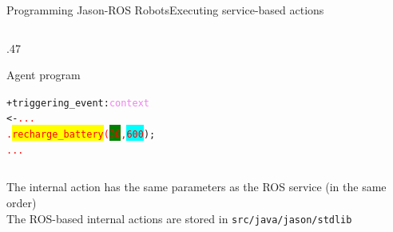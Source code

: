 \documentclass[compress]{beamer}
\newcommand{\planhead}[1]{\textcolor{indiagreen}{#1}}
\newcommand{\instruction}[1]{\textcolor{red}{#1}}
\newcommand{\belief}[1]{\textcolor{violet}{#1}}
\begin{document}
\begin{frame}[fragile]{Programming Jason-ROS Robots}{Executing service-based actions}{}
\begin{columns}
\begin{column}{.47\textwidth}

\begin{block}{{\ssmall Agent program}}

\begin{alltt}\ssmall
 
   

 +\planhead{triggering\_event} : \belief{context}
    <- \instruction{...}
       \instruction{.\colorbox{yellow}{recharge_battery}(\colorbox{green}{30}, \colorbox{cyan}{600}});
       \instruction{...}
       
       
       
       
       
\end{alltt}
\end{block}
 \end{column}
\end{columns} 

 {\tiny The internal action has the same parameters as the ROS service (in the same order)}\\ 
 
 {\tiny The ROS-based internal actions are stored in \texttt{src/java/jason/stdlib}}
 
\end{frame}
\end{document}
